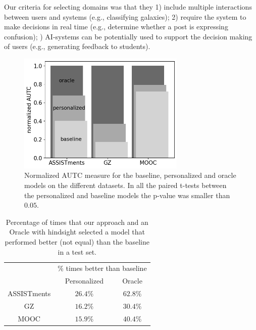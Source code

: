 \documentclass[letterpaper]{article} %
\theoremstyle{definition}
\newcommand{\kibitz}[2]{\ifnum\Comments=1{\color{#1}{#2}}\fi}
\newcommand{\li}[1]{\kibitz{brown}{[LL:#1]}}
\begin{document}
 Our criteria for selecting domains was that they 1) include multiple interactions between users and systems (e.g., classifying galaxies); 2) require  the system to make decisions in real time (e.g., determine whether a post is expressing confusion); \li{In this example the system is making decisions in real time, not the user. Maybe you meant that the system has to make decisions in real time?} 3) AI-systems can be potentially used to support the decision making of users (e.g., generating feedback to students).
%
\begin{figure}[t]
     \centering
     \includegraphics[width=8cm]{bar_graph}
     \caption{Normalized AUTC measure for the baseline, personalized and oracle models on the different datasets. In all the paired t-tests between the personalized and baseline models the p-value was smaller than $0.05$.}
    \label{fig:bar_graph}
\end{figure}
%
\begin{table}[t]
    \begin{center}
    {
    \setlength{\tabcolsep}{4pt}
    \begin{tabular}{c|cc}
    \hline
    \rule{0pt}{12pt}
    \multirow{2}{*}{Dataset}&\multicolumn{2}{c}{\% times better than baseline}\\
    \rule{0pt}{12pt}
    & Personalized& Oracle
    \\\hline
    \rule{0pt}{12pt}ASSISTments&$26.4\%$&$62.8\%$\\
    \rule{0pt}{12pt}GZ&$16.2\%$&$30.4\%$\\
    \rule{0pt}{12pt}MOOC&$15.9\%$&$40.4\%$\\
    \hline
    \end{tabular}
    \caption{Percentage of times that our approach and an Oracle with hindsight selected a model that performed better (not equal) than the baseline in a test set.}
    \label{tab:agent_results}}
    \end{center}
\end{table}
\end{document}
